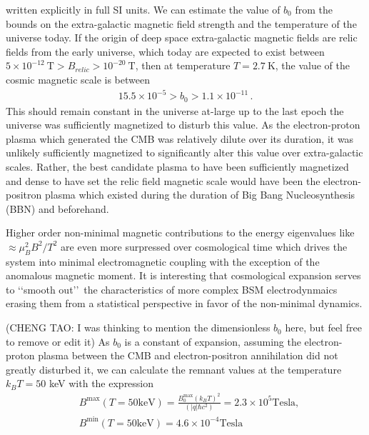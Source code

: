 \documentclass[Universe,article,submit,moreauthors,pdftex]{Definitions/mdpi}
\begin{document}
written explicitly in full SI units. We can estimate the value of $b_{0}$ from the bounds on the extra-galactic magnetic field strength and the temperature of the universe today.  If the origin of deep space extra-galactic magnetic fields are relic fields from the early universe, which today are expected to exist between $5\times10^{-12}\ \mathrm{T}>B_{relic}>10^{-20}\ \mathrm{T}$, then at temperature $T=2.7\ \mathrm{K}$, the value of the cosmic magnetic scale is between
\begin{alignat}{1}
    \label{BoScale} 5.5\times10^{-5}>b_{0}>1.1\times10^{-11}\,.
\end{alignat}
This should remain constant in the universe at-large up to the last epoch the universe was sufficiently magnetized to disturb this value. As the electron-proton plasma which generated the CMB was relatively dilute over its duration, it was unlikely sufficiently magnetized to significantly alter this value over extra-galactic scales. Rather, the best candidate plasma to have been sufficiently magnetized and dense to have set the relic field magnetic scale would have been the electron-positron plasma which existed during the duration of Big Bang Nucleosynthesis (BBN) and beforehand.

Higher order non-minimal magnetic contributions to the energy eigenvalues like $\approx\mu_{B}^{2}B^{2}/T^{2}$ are even more surpressed over cosmological time which drives the system into minimal electromagnetic coupling with the exception of the anomalous magnetic moment. It is interesting that cosmological expansion serves to \lq\lq smooth out\rq\rq\ the characteristics of more complex BSM electrodynmaics erasing them from a statistical perspective in favor of the non-minimal dynamics.

{\color{blue}(CHENG TAO: I was thinking to mention the dimensionless $b_0$ here, but feel free to remove or edit it)
As $b_0$ is a constant of expansion, assuming the electron-proton plasma between the CMB and electron-positron annihilation did not greatly disturbed it, we can calculate the remnant values at the temperature $k_BT=50$ keV with the expression
\begin{align}
&B^{\mathrm{max}}(T=50 \mathrm{keV}) = \frac{B^{\mathrm{max}}_0(k_B T)^2}{(|q|\hbar c^2)}= 2.3\times10^5 \mathrm{Tesla},\\
&B^{\mathrm{min}}(T=50 \mathrm{keV})= 4.6\times10^{-4} \mathrm{Tesla}
\end{align}}
\end{document}
